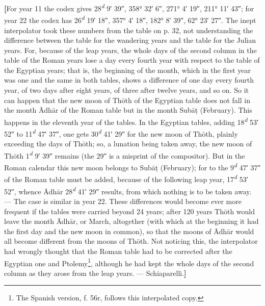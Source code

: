 \documentclass[11pt]{article}
\begin{document}
\par \textbf{[}For year 11 the codex gives 28\textsuperscript{\itshape d} 9′ 39″, 358° 32′ 6″, 271° 4′ 19″, 211° 11′ 43″; for year 22 the codex has 26\textsuperscript{\itshape d} 19′ 18″, 357° 4′ 18″, 182° 8′ 39″, 62° 23′ 27″. The inept interpolator took these numbers from the table on p. 32, not understanding the difference between the table for the wandering years and the table for the Julian years. For, because of the leap years, the whole days of the second column in the table of the Roman years lose a day every fourth year with respect to the table of the Egyptian years; that is, the beginning of the month, which in the first year was one and the same in both tables, shows a difference of one day every fourth year, of two days after eight years, of three after twelve years, and so on. So it can happen that the new moon of Thōth of the Egyptian table does not fall in the month Ādhār of the Roman table but in the month Subāṭ (February). This happens in the eleventh year of the tables. In the Egyptian tables, adding 18\textsuperscript{\itshape d} 53′ 52″ to 11\textsuperscript{\itshape d} 47′ 37″, one gets 30\textsuperscript{\itshape d} 41′ 29″ for the new moon of Thōth, plainly exceeding the days of Thōth; so, a lunation being taken away, the new moon of Thōth 1\textsuperscript{\itshape d} 9′ 39″ remains (the 29″ is a misprint of the compositor). But in the Roman calendar this new moon belongs to Subāṭ (February); for to the 9\textsuperscript{\itshape d} 47′ 37″ of the Roman table must be added, because of the following leap year, 17\textsuperscript{\itshape d} 53′ 52″, whence Ādhār 28\textsuperscript{\itshape d} 41′ 29″ results, from which nothing is to be taken away. — The case is similar in year 22. These differences would become ever more frequent if the tables were carried beyond 24 years; after 120 years Thōth would leave the month Ādhār, or March, altogether (with which at the beginning it had the first day and the new moon in common), so that the moons of Ādhār would all become different from the moons of Thōth. Not noticing this, the interpolator had wrongly thought that the Roman table had to be corrected after the Egyptian one and Ptolemy\footnote{The Spanish version, f. 56r, follows this interpolated copy.}, although he had kept the whole days of the second column as they arose from the leap years. — Schiaparelli.\textbf{]}\par
\end{document}
